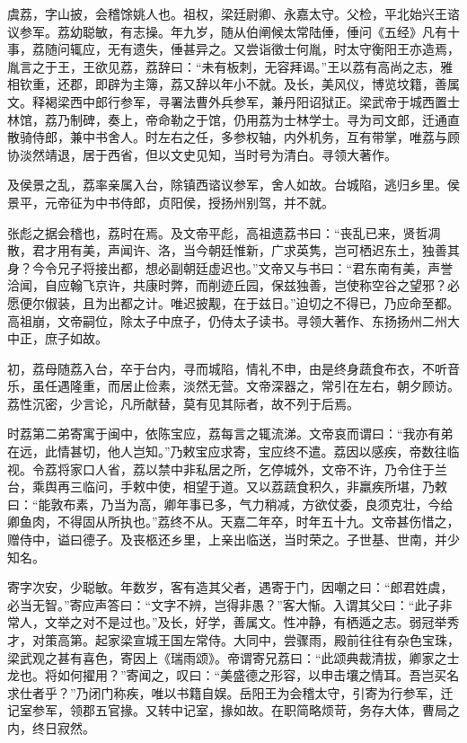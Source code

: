 \documentclass[]{article}
\begin{document}
虞荔，字山披，会稽馀姚人也。祖权，梁廷尉卿、永嘉太守。父检，平北始兴王谘议参军。荔幼聪敏，有志操。年九岁，随从伯阐候太常陆倕，倕问《五经》凡有十事，荔随问辄应，无有遗失，倕甚异之。又尝诣徵士何胤，时太守衡阳王亦造焉，胤言之于王，王欲见荔，荔辞曰：``未有板刺，无容拜谒。''王以荔有高尚之志，雅相钦重，还郡，即辟为主簿，荔又辞以年小不就。及长，美风仪，博览坟籍，善属文。释褐梁西中郎行参军，寻署法曹外兵参军，兼丹阳诏狱正。梁武帝于城西置士林馆，荔乃制碑，奏上，帝命勒之于馆，仍用荔为士林学士。寻为司文郎，迁通直散骑侍郎，兼中书舍人。时左右之任，多参权轴，内外机务，互有带掌，唯荔与顾协淡然靖退，居于西省，但以文史见知，当时号为清白。寻领大著作。

及侯景之乱，荔率亲属入台，除镇西谘议参军，舍人如故。台城陷，逃归乡里。侯景平，元帝征为中书侍郎，贞阳侯，授扬州别驾，并不就。

张彪之据会稽也，荔时在焉。及文帝平彪，高祖遗荔书曰：``丧乱已来，贤哲凋散，君才用有美，声闻许、洛，当今朝廷惟新，广求英隽，岂可栖迟东土，独善其身？今令兄子将接出都，想必副朝廷虚迟也。''文帝又与书曰：``君东南有美，声誉洽闻，自应翰飞京许，共康时弊，而削迹丘园，保兹独善，岂使称空谷之望邪？必愿便尔俶装，且为出都之计。唯迟披觏，在于兹日。''迫切之不得已，乃应命至都。高祖崩，文帝嗣位，除太子中庶子，仍侍太子读书。寻领大著作、东扬扬州二州大中正，庶子如故。

初，荔母随荔入台，卒于台内，寻而城陷，情礼不申，由是终身蔬食布衣，不听音乐，虽任遇隆重，而居止俭素，淡然无营。文帝深器之，常引在左右，朝夕顾访。荔性沉密，少言论，凡所献替，莫有见其际者，故不列于后焉。

时荔第二弟寄寓于闽中，依陈宝应，荔每言之辄流涕。文帝哀而谓曰：``我亦有弟在远，此情甚切，他人岂知。''乃敕宝应求寄，宝应终不遣。荔因以感疾，帝数往临视。令荔将家口人省，荔以禁中非私居之所，乞停城外，文帝不许，乃令住于兰台，乘舆再三临问，手敕中使，相望于道。又以荔蔬食积久，非羸疾所堪，乃敕曰：``能敦布素，乃当为高，卿年事已多，气力稍减，方欲仗委，良须克壮，今给卿鱼肉，不得固从所执也。''荔终不从。天嘉二年卒，时年五十九。文帝甚伤惜之，赠侍中，谥曰德子。及丧柩还乡里，上亲出临送，当时荣之。子世基、世南，并少知名。

寄字次安，少聪敏。年数岁，客有造其父者，遇寄于门，因嘲之曰：``郎君姓虞，必当无智。''寄应声答曰：``文字不辨，岂得非愚？''客大惭。入谓其父曰：``此子非常人，文举之对不是过也。''及长，好学，善属文。性冲静，有栖遁之志。弱冠举秀才，对策高第。起家梁宣城王国左常侍。大同中，尝骤雨，殿前往往有杂色宝珠，梁武观之甚有喜色，寄因上《瑞雨颂》。帝谓寄兄荔曰：``此颂典裁清拔，卿家之士龙也。将如何擢用？''寄闻之，叹曰：``美盛德之形容，以申击壤之情耳。吾岂买名求仕者乎？''乃闭门称疾，唯以书籍自娱。岳阳王为会稽太守，引寄为行参军，迁记室参军，领郡五官掾。又转中记室，掾如故。在职简略烦苛，务存大体，曹局之内，终日寂然。
\end{document}
